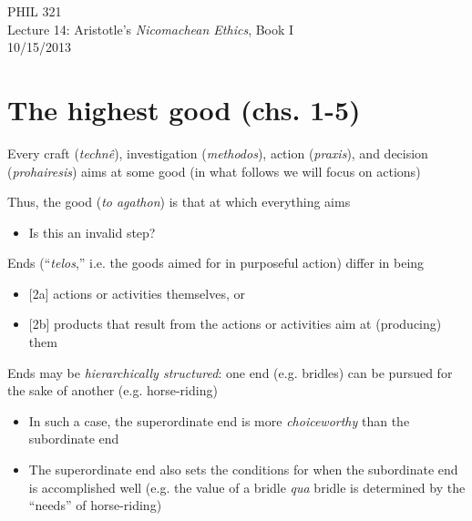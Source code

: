 \documentclass[11pt]{article}
\begin{document}
\thispagestyle{empty}
\begin{center} \LARGE{PHIL 321\\ Lecture 14: Aristotle's \emph{Nicomachean Ethics}, Book I}\\ \vspace*{2mm}
\large{10/15/2013}\end{center}
\thispagestyle{empty}\vspace*{3mm}
\vspace*{-8mm}

\section*{The highest good (chs. 1-5)}

\noindent [1] Every craft (\emph{techn\^{e}}), investigation (\emph{methodos}), action (\emph{praxis}), and decision (\emph{prohairesis}) aims at some good (in what follows we will focus on actions)
\vspace*{2mm}

\noindent [2] Thus, the good (\emph{to agathon}) is that at which everything aims

\begin{itemize}\item{Is this an invalid step?}\end{itemize}

\noindent [3] Ends (``\emph{telos},'' i.e. the goods aimed for in purposeful action) differ in being
\begin{itemize}\item{[2a] actions or activities themselves, or}\item{[2b] products that result from the actions or activities aim at (producing) them}\end{itemize}

\noindent [4] Ends may be \emph{hierarchically structured}: one end (e.g. bridles) can be pursued for the sake of another (e.g. horse-riding)
\begin{itemize}\item{In such a case, the superordinate end is more \emph{choiceworthy} than the subordinate end}\item{The superordinate end also sets the conditions for when the subordinate end is accomplished well (e.g. the value of a bridle \emph{qua} bridle is determined by the ``needs'' of horse-riding)}\end{itemize}
\end{document}
